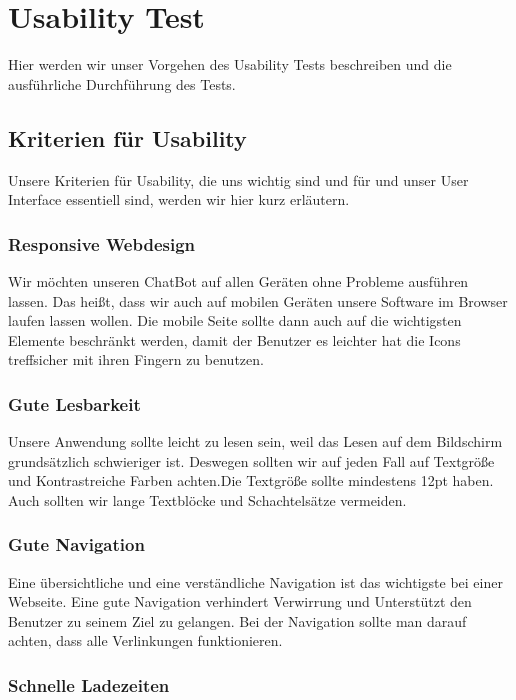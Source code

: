 \section{Usability Test}
Hier werden wir unser Vorgehen des Usability Tests beschreiben und die ausführliche
Durchführung des Tests.

\subsection{Kriterien für Usability}
Unsere Kriterien für Usability, die uns wichtig sind und für und unser User Interface
essentiell sind, werden wir hier kurz erläutern.

\subsubsection{Responsive Webdesign}

\noindent Wir möchten unseren ChatBot auf allen Geräten ohne Probleme ausführen lassen.
Das heißt, dass wir auch auf mobilen Geräten unsere Software im Browser laufen lassen wollen.
Die mobile Seite sollte dann auch auf die wichtigsten Elemente beschränkt werden, damit
der Benutzer es leichter hat die Icons treffsicher mit ihren Fingern zu benutzen.

\subsubsection{Gute Lesbarkeit}

\noindent Unsere Anwendung sollte leicht zu lesen sein, weil das Lesen auf dem Bildschirm
grundsätzlich schwieriger ist. Deswegen sollten wir auf jeden Fall
auf Textgröße und Kontrastreiche Farben achten.Die Textgröße sollte mindestens
12pt haben. Auch sollten wir lange Textblöcke und
Schachtelsätze vermeiden.

\subsubsection{Gute Navigation}

\noindent Eine übersichtliche und eine verständliche Navigation ist das wichtigste bei einer Webseite.
Eine gute Navigation verhindert Verwirrung und Unterstützt den Benutzer zu seinem Ziel zu gelangen.
Bei der Navigation sollte man darauf achten, dass alle Verlinkungen funktionieren.

\subsubsection{Schnelle Ladezeiten}


